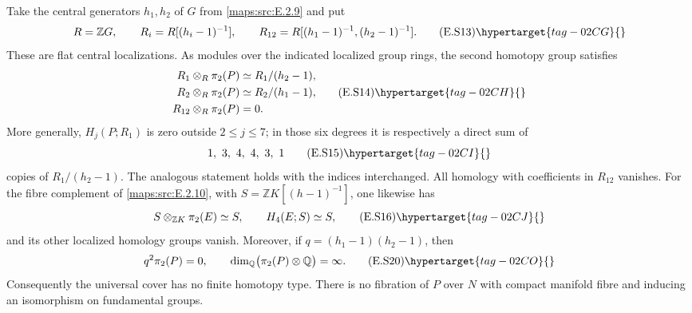 \begin{theorem}\hypertarget{tag-02MC}{}\label{maps:src:E.2.12}


Take the central generators $h_1,h_2$ of $G$ from \ref{maps:src:E.2.9} and put
\[
 R=\mathbb ZG,\qquad R_i=R[(h_i-1)^{-1}],\qquad
              R_{12}=R[(h_1-1)^{-1},(h_2-1)^{-1}].
 \tag{E.S13}\hypertarget{tag-02CG}{}\label{maps:eq:E.S13}
\]
These are flat central localizations. As modules over the indicated
localized group rings, the second homotopy group satisfies
\[
 \begin{split}
 R_1\otimes_R\pi_2(P)&\simeq R_1/(h_2-1),\\
 R_2\otimes_R\pi_2(P)&\simeq R_2/(h_1-1),\\
 R_{12}\otimes_R\pi_2(P)&=0.
 \end{split}
 \tag{E.S14}\hypertarget{tag-02CH}{}\label{maps:eq:E.S14}
\]
More generally, $H_j(P;R_1)$ is zero outside $2\leq j\leq7$;
in those six degrees it is respectively a direct sum of
\[
                  1,\ 3,\ 4,\ 4,\ 3,\ 1
 \tag{E.S15}\hypertarget{tag-02CI}{}\label{maps:eq:E.S15}
\]
copies of $R_1/(h_2-1)$. The analogous statement holds with the
indices interchanged. All homology with coefficients in $R_{12}$
vanishes. For the fibre complement of \ref{maps:src:E.2.10}, with
$S=\mathbb ZK[(h-1)^{-1}]$, one likewise has
\[
             S\otimes_{\mathbb ZK}\pi_2(E)\simeq S,
       \qquad H_4(E;S)\simeq S,
 \tag{E.S16}\hypertarget{tag-02CJ}{}\label{maps:eq:E.S16}
\]
and its other localized homology groups vanish. Moreover, if
$q=(h_1-1)(h_2-1)$, then
\[
                  q^2\pi_2(P)=0,
        \qquad \dim_{\mathbb Q}\bigl(\pi_2(P)\otimes\mathbb Q\bigr)
                     =\infty.
 \tag{E.S20}\hypertarget{tag-02CO}{}\label{maps:eq:E.S20}
\]
Consequently the universal cover has no finite homotopy type.
There is no fibration of $P$ over $N$ with compact manifold fibre
and inducing an isomorphism on fundamental groups.

\end{theorem}


